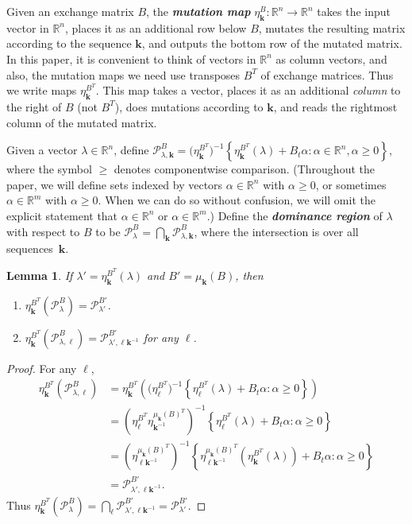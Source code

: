 \documentclass{amsart}
\newtheorem{lemma}[proposition]{Lemma}
\theoremstyle{definition}
\theoremstyle{remark}
\numberwithin{equation}{section}
\newcommand{\newword}[1]{\textbf{\emph{#1}}}
\newcommand{\reals}{\mathbb R}
\newcommand{\set}[1]{{\left\lbrace #1 \right\rbrace}}
\newcommand{\0}{{\mathbf{0}}}
\newcommand{\kk}{\mathbf{k}}
\renewcommand{\ll}{{\boldsymbol\ell}}
\renewcommand{\P}{\mathcal{P}}
\begin{document}
Given an exchange matrix $B$, the \newword{mutation map} $\eta^B_\kk:\reals^n\to\reals^n$ takes the input vector in $\reals^n$, places it as an additional row below $B$, mutates the resulting matrix according to the sequence $\kk$, and outputs the bottom row of the mutated matrix.
In this paper, it is convenient to think of vectors in $\reals^n$ as column vectors, and also, the mutation maps we need use transposes $B^T$ of exchange matrices.
Thus we write maps $\eta_\kk^{B^T}$.
This map takes a vector, places it as an additional \emph{column} to the right of $B$ (not $B^T$), does mutations according to $\kk$, and reads the rightmost column of the mutated matrix.

Given a vector $\lambda\in\reals^n$, define $\P^B_{\lambda,\kk}=\bigl(\eta_{\kk}^{B^T}\bigr)^{-1}\set{\eta_\kk^{B^T}(\lambda)+B_t\alpha:\alpha\in\reals^n,\alpha\ge0}$, where the symbol $\ge$ denotes componentwise comparison.
(Throughout the paper, we will define sets indexed by vectors $\alpha\in\reals^n$ with $\alpha\ge0$, or sometimes $\alpha\in\reals^m$ with $\alpha\ge0$.
When we can do so without confusion, we will omit the explicit statement that $\alpha\in\reals^n$ or $\alpha\in\reals^m$.)
Define the \newword{dominance region} of $\lambda$ with respect to $B$ to be $\P^B_\lambda=\bigcap_\kk\P^B_{\lambda,\kk}$, where the intersection is over all sequences~$\kk$.
\begin{lemma}\label{shift}
If $\lambda'=\eta^{B^T}_\kk(\lambda)$ and $B'=\mu_\kk(B)$, then 
\begin{enumerate}[\quad\bf1.]
\item \label{shift all}
$\eta^{B^T}_\kk\!\!(\P^B_\lambda)=\P^{B'}_{\lambda'}$.
\item \label{shift one}
$\eta^{B^T}_\kk\!\!(\P^B_{\lambda,\ll})=\P^{B'}_{\lambda',\ll\kk^{-1}}$ for any $\ll$.
\end{enumerate}
\end{lemma}
\begin{proof}
For any $\ll$,
\begin{align*}
\eta^{B^T}_\kk\!\!(\P^B_{\lambda,\ll})
&=\eta^{B^T}_\kk\!\!\left(\bigl(\eta_{\ll}^{B^T}\bigr)^{-1}\set{\eta_\ll^{B^T}(\lambda)+B_t\alpha:\alpha\ge0}\right)\\
&=\left(\eta^{B^T}_\ll\!\!\eta_{\kk^{-1}}^{\mu_\kk(B)^T}\right)^{-1}\set{\eta_\ll^{B^T}(\lambda)+B_t\alpha:\alpha\ge0}\\
&=\left(\eta^{\mu_\kk(B)^T}_{\ll\kk^{-1}}\right)^{-1}\set{\eta^{\mu_\kk(B)^T}_{\ll\kk^{-1}}\left(\eta^{B^T}_\kk(\lambda)\right)+B_t\alpha:\alpha\ge0}\\
&=\P^{B'}_{\lambda',\ll\kk^{-1}}.
\end{align*}
Thus $\eta^{B^T}_\kk\!\!(\P^B_\lambda)=\bigcap_\ll\P^{B'}_{\lambda',\ll\kk^{-1}}=\P^{B'}_{\lambda'}$.
\end{proof}
\end{document}
